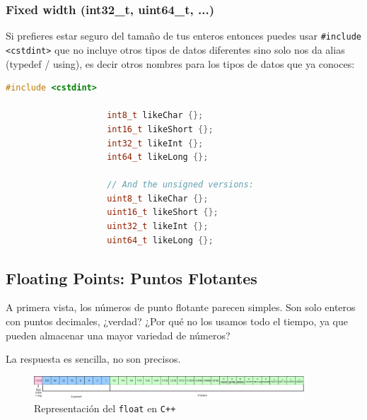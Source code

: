 \documentclass[12pt, fleqn]{report}                             %
\theoremstyle{break}                                            %
\newcommand{\textCode}[1]  { \texttt{#1} }                      %
\newcommand{\Cpp}{\ignorespaces\textCode{C++}}                  %
\begin{document}
                \subsubsection{Fixed width (int32\_t, uint64\_t, ...)}

                Si prefieres estar seguro del tamaño de tus enteros entonces puedes usar 
                \textCode{\#include <cstdint>} que no incluye otros tipos de datos diferentes sino solo
                nos da alias (typedef / using), es decir otros nombres para los tipos de datos que ya conoces:
                \begin{lstlisting}[language=C++, gobble=20]
                    #include <cstdint>
                    
                    int8_t likeChar {};
                    int16_t likeShort {};
                    int32_t likeInt {};
                    int64_t likeLong {};

                    // And the unsigned versions:
                    uint8_t likeChar {};
                    uint16_t likeShort {};
                    uint32_t likeInt {};
                    uint64_t likeLong {};
                \end{lstlisting}
                    

            \clearpage
            \subsection{Floating Points: Puntos Flotantes}

                A primera vista, los números de punto flotante parecen simples.
                Son solo enteros con puntos decimales, ¿verdad? 
                ¿Por qué no los usamos todo el tiempo, ya que pueden almacenar una mayor variedad de números?

                La respuesta es sencilla, no son precisos.

                \begin{figure}[h]
                    \centering
                    \includegraphics[width=0.9\textwidth]{IEEEFP}
                    \caption{\footnotesize{Representación del \textCode{float} en \Cpp}}
                \end{figure}
\end{document}
